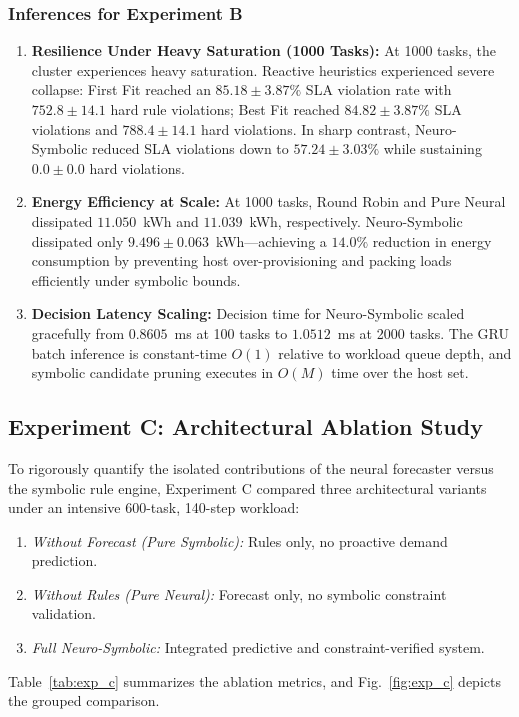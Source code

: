 \documentclass[conference]{IEEEtran}
\begin{document}
\subsubsection{Inferences for Experiment B}
\begin{enumerate}
    \item \textbf{Resilience Under Heavy Saturation (1000 Tasks):} At 1000 tasks, the cluster experiences heavy saturation. Reactive heuristics experienced severe collapse: First Fit reached an $85.18 \pm 3.87\%$ SLA violation rate with $752.8 \pm 14.1$ hard rule violations; Best Fit reached $84.82 \pm 3.87\%$ SLA violations and $788.4 \pm 14.1$ hard violations. In sharp contrast, Neuro-Symbolic reduced SLA violations down to $57.24 \pm 3.03\%$ while sustaining $\mathbf{0.0 \pm 0.0}$ hard violations.
    \item \textbf{Energy Efficiency at Scale:} At 1000 tasks, Round Robin and Pure Neural dissipated $11.050$~kWh and $11.039$~kWh, respectively. Neuro-Symbolic dissipated only $9.496 \pm 0.063$~kWh---achieving a $\mathbf{14.0\%}$ reduction in energy consumption by preventing host over-provisioning and packing loads efficiently under symbolic bounds.
    \item \textbf{Decision Latency Scaling:} Decision time for Neuro-Symbolic scaled gracefully from $0.8605$~ms at 100 tasks to $1.0512$~ms at 2000 tasks. The GRU batch inference is constant-time $O(1)$ relative to workload queue depth, and symbolic candidate pruning executes in $O(M)$ time over the host set.
\end{enumerate}

\subsection{Experiment C: Architectural Ablation Study}
To rigorously quantify the isolated contributions of the neural forecaster versus the symbolic rule engine, Experiment C compared three architectural variants under an intensive 600-task, 140-step workload:
\begin{enumerate}
    \item \textit{Without Forecast (Pure Symbolic):} Rules only, no proactive demand prediction.
    \item \textit{Without Rules (Pure Neural):} Forecast only, no symbolic constraint validation.
    \item \textit{Full Neuro-Symbolic:} Integrated predictive and constraint-verified system.
\end{enumerate}
Table~\ref{tab:exp_c} summarizes the ablation metrics, and Fig.~\ref{fig:exp_c} depicts the grouped comparison.
\end{document}
